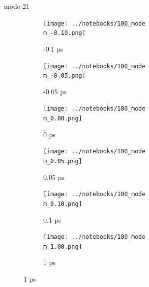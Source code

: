 \documentclass{beamer}
\newcommand\w{0.32}
\begin{document}
\renewcommand\m{21}
\begin{frame}{mode \m}
	\begin{figure}
		\centering
		\begin{subfigure}[b]{\w\textwidth}
			\centering
			\texttt{[image: ../notebooks/100\_mode\\m\_-0.10.png]}
			\caption{-0.1 ps}
		\end{subfigure}
		\begin{subfigure}[b]{\w\textwidth}
			\centering
			\texttt{[image: ../notebooks/100\_mode\\m\_-0.05.png]}
			\caption{-0.05 ps}
		\end{subfigure}
		\begin{subfigure}[b]{\w\textwidth}
			\centering
			\texttt{[image: ../notebooks/100\_mode\\m\_0.00.png]}
			\caption{0 ps}
		\end{subfigure}
		\begin{subfigure}[b]{\w\textwidth}
			\centering
			\texttt{[image: ../notebooks/100\_mode\\m\_0.05.png]}
			\caption{0.05 ps}
		\end{subfigure}
		\begin{subfigure}[b]{\w\textwidth}
			\centering
			\texttt{[image: ../notebooks/100\_mode\\m\_0.10.png]}
			\caption{0.1 ps}
		\end{subfigure}
		\begin{subfigure}[b]{\w\textwidth}
			\centering
			\texttt{[image: ../notebooks/100\_mode\\m\_1.00.png]}
			\caption{1 ps}
		\end{subfigure}
	\end{figure}
\end{frame}
\end{document}
